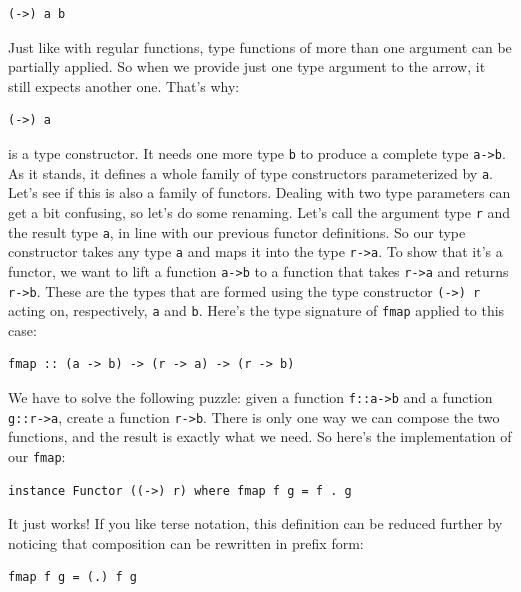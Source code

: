 \begin{verbatim}
(->) a b
\end{verbatim}

Just like with regular functions, type functions of more than one
argument can be partially applied. So when we provide just one type
argument to the arrow, it still expects another one. That's why:

\begin{verbatim}
(->) a
\end{verbatim}

is a type constructor. It needs one more type \texttt{b} to produce a
complete type \texttt{a-\textgreater{}b}. As it stands, it defines a
whole family of type constructors parameterized by \texttt{a}. Let's see
if this is also a family of functors. Dealing with two type parameters
can get a bit confusing, so let's do some renaming. Let's call the
argument type \texttt{r} and the result type \texttt{a}, in line with
our previous functor definitions. So our type constructor takes any type
\texttt{a} and maps it into the type \texttt{r-\textgreater{}a}. To show
that it's a functor, we want to lift a function
\texttt{a-\textgreater{}b} to a function that takes
\texttt{r-\textgreater{}a} and returns \texttt{r-\textgreater{}b}. These
are the types that are formed using the type constructor
\texttt{(-\textgreater{})\ r} acting on, respectively, \texttt{a} and
\texttt{b}. Here's the type signature of \texttt{fmap} applied to this
case:

\begin{verbatim}
fmap :: (a -> b) -> (r -> a) -> (r -> b)
\end{verbatim}

We have to solve the following puzzle: given a function
\texttt{f::a-\textgreater{}b} and a function
\texttt{g::r-\textgreater{}a}, create a function
\texttt{r-\textgreater{}b}. There is only one way we can compose the two
functions, and the result is exactly what we need. So here's the
implementation of our \texttt{fmap}:

\begin{verbatim}
instance Functor ((->) r) where fmap f g = f . g
\end{verbatim}

It just works! If you like terse notation, this definition can be
reduced further by noticing that composition can be rewritten in prefix
form:

\begin{verbatim}
fmap f g = (.) f g
\end{verbatim}

